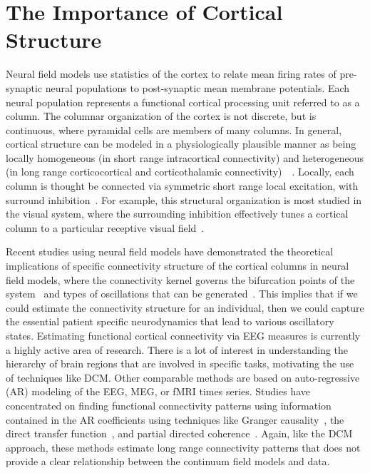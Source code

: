 \documentclass[onecolumn,draftcls]{IEEEtran}
\begin{document}
\section{The Importance of Cortical Structure}
Neural field models use statistics of the cortex to relate mean firing rates of pre-synaptic neural populations to post-synaptic mean membrane potentials. Each neural population represents a functional cortical processing unit referred to as a column. The columnar organization of the cortex is not discrete, but is continuous, where pyramidal cells are members of many columns. In general, cortical structure can be modeled in a physiologically plausible manner as being locally homogeneous (in short range intracortical connectivity) and heterogeneous (in long range corticocortical and corticothalamic connectivity)~\cite{Jirsa2009}~\cite{Qubbaj2007}. Locally, each column is thought be connected via symmetric short range local excitation, with surround inhibition~\cite{Braitenberg1998}. For example, this structural organization is most studied in the visual system, where the surrounding inhibition effectively tunes a cortical column to a particular receptive visual field~\cite{Sullivan2006}.

Recent studies using neural field models have demonstrated the theoretical implications of specific connectivity structure of the cortical columns in neural field models, where the connectivity kernel governs the bifurcation points of the system~\cite{Hutt2005} and types of oscillations that can be generated~\cite{Schmidt2009}. This implies that if we could estimate the connectivity structure for an individual, then we could capture the essential patient specific neurodynamics that lead to various oscillatory states. Estimating functional cortical connectivity via EEG measures is currently a highly active area of research. There is a lot of interest in understanding the hierarchy of brain regions that are involved in specific tasks, motivating the use of techniques like DCM. Other comparable methods are based on auto-regressive (AR) modeling of the EEG, MEG, or fMRI times series. Studies have concentrated on finding functional connectivity patterns using information contained in the AR coefficients using techniques like Granger causality~\cite{Hesse2003}, the direct transfer function~\cite{Kaminski1991}, and partial directed coherence~\cite{Sameshima1999}. Again, like the DCM approach, these methods estimate long range connectivity patterns that does not provide a clear relationship between the continuum field models and data.
\end{document}
